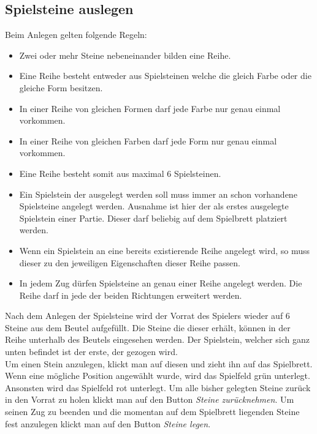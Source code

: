\documentclass[a4paper, ngerman]{scrartcl}
\begin{document}
\subsection{Spielsteine auslegen}
Beim Anlegen gelten folgende Regeln:
\begin{itemize}
\item Zwei oder mehr Steine nebeneinander bilden eine Reihe.
\item Eine Reihe besteht entweder aus Spielsteinen welche die gleich Farbe oder die gleiche Form besitzen.
\item In einer Reihe von gleichen Formen darf jede Farbe nur genau einmal vorkommen.
\item In einer Reihe von gleichen Farben darf jede Form nur genau einmal vorkommen.
\item Eine Reihe besteht somit aus maximal 6 Spielsteinen.
\item Ein Spielstein der ausgelegt werden soll muss immer an schon vorhandene Spielsteine angelegt werden. Ausnahme ist hier der als erstes ausgelegte Spielstein einer Partie. Dieser darf beliebig auf dem Spielbrett platziert werden.
\item Wenn ein Spielstein an eine bereits existierende Reihe angelegt wird, so muss dieser zu den jeweiligen Eigenschaften dieser Reihe passen.
\item In jedem Zug dürfen Spielsteine an genau einer Reihe angelegt werden. Die Reihe darf in jede der beiden Richtungen erweitert werden.
\end{itemize}

Nach dem Anlegen der Spielsteine wird der Vorrat des Spielers wieder auf 6 Steine aus dem Beutel aufgefüllt. Die Steine die dieser erhält, können in der Reihe unterhalb des Beutels eingesehen werden. Der Spielstein, welcher sich ganz unten befindet ist der erste, der gezogen wird.\\
Um einen Stein anzulegen, klickt man auf diesen und zieht ihn auf das Spielbrett. Wenn eine mögliche Position angewählt wurde, wird das Spielfeld grün unterlegt. Ansonsten wird das Spielfeld rot unterlegt. Um alle bisher gelegten Steine zurück in den Vorrat zu holen klickt man auf den Button \emph{Steine zurücknehmen}. Um seinen Zug zu beenden und die momentan auf dem Spielbrett liegenden Steine fest anzulegen klickt man auf den Button \emph{Steine legen}.
	 
\end{document}
